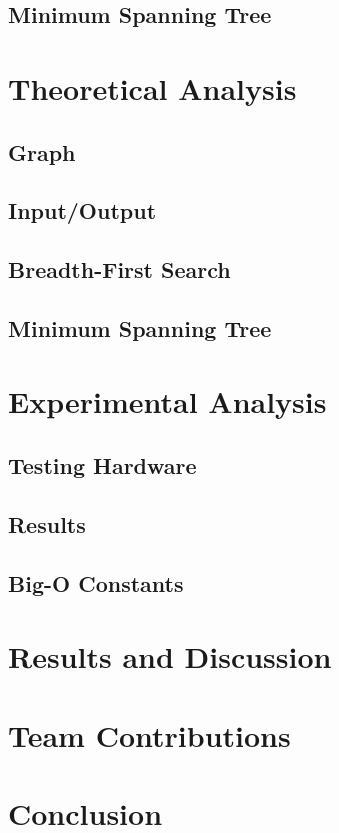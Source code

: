 \documentclass[titlepage]{article}
\begin{document}
\begin{multicols}{2}
			\subsection{Minimum Spanning Tree}

		\section{Theoretical Analysis}
			\subsection{Graph}
			\subsection{Input/Output}
			\subsection{Breadth-First Search}
			\subsection{Minimum Spanning Tree}

		\section{Experimental Analysis}
			\subsection{Testing Hardware}
			\subsection{Results}
			\subsection{Big-O Constants}
		\section{Results and Discussion}
		\section{Team Contributions}
		\section{Conclusion}
	\end{multicols}
\end{document}

